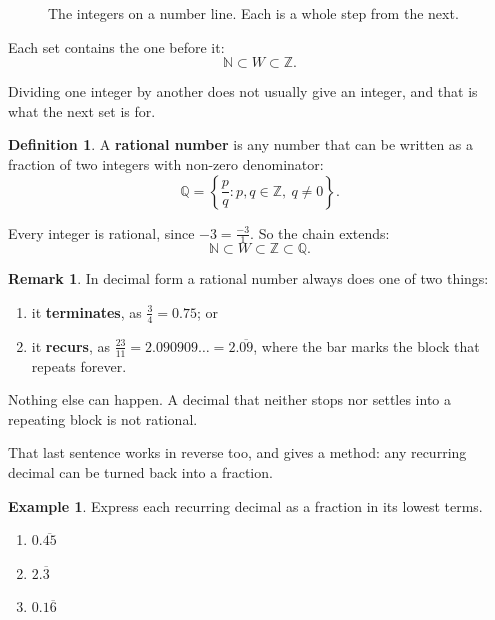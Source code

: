 \documentclass[11pt,a4paper]{article}
\theoremstyle{definition}
\newtheorem{definition}[thm]{Definition}
\newtheorem{example}[thm]{Example}
\newtheorem{remark}[thm]{Remark}
\begin{document}
\begin{figure}[H]
\centering
{}
\caption{The integers on a number line. Each is a whole step from the next.}
\end{figure}

Each set contains the one before it:
$$\mathbb{N}\subset W\subset\mathbb{Z}.$$

Dividing one integer by another does not usually give an integer, and that is what the
next set is for.

\begin{definition}
A \textbf{rational number} is any number that can be written as a fraction of two
integers with non-zero denominator:
$$\mathbb{Q}=\left\{\frac{p}{q} : p,q\in\mathbb{Z},\ q\neq 0\right\}.$$
\end{definition}

Every integer is rational, since $-3=\frac{-3}{1}$. So the chain extends:
$$\mathbb{N}\subset W\subset\mathbb{Z}\subset\mathbb{Q}.$$

\begin{remark}
In decimal form a rational number always does one of two things:
\begin{enumerate}
\item[(i).] it \textbf{terminates}, as $\frac{3}{4}=0.75$; or
\item[(ii).] it \textbf{recurs}, as $\frac{23}{11}=2.090909\ldots=2.\overline{09}$,
where the bar marks the block that repeats forever.
\end{enumerate}
Nothing else can happen. A decimal that neither stops nor settles into a repeating
block is not rational.
\end{remark}

That last sentence works in reverse too, and gives a method: any recurring decimal
can be turned back into a fraction.

\begin{example}
Express each recurring decimal as a fraction in its lowest terms.
\begin{enumerate}
\item[(a).] $0.\overline{45}$
\item[(b).] $2.\overline{3}$
\item[(c).] $0.1\overline{6}$
\end{enumerate}
\end{example}
\end{document}
